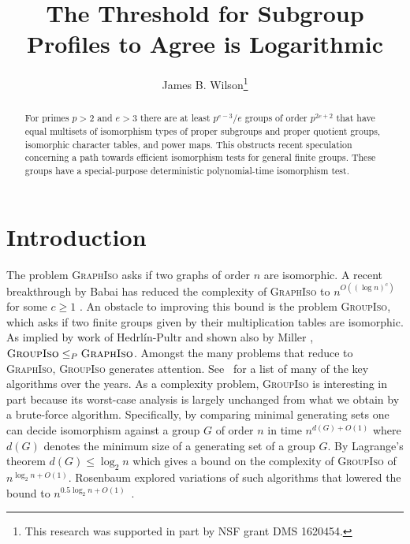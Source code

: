 \documentclass{toc}
\numberwithin{equation}{section}
\theoremstyle{plain}       %
\theoremstyle{remark}
\theoremstyle{definition}
\numberwithin{figure}{section}
\numberwithin{table}{section}
\begin{document}
\begin{frontmatter}[classification=text]
  
%
%
%
\title{The Threshold for Subgroup Profiles to Agree is Logarithmic}
%

%
%

%
%
%

%
%
%
%
%
%
%
%
%
%
%
%


%
%
%
%

%

\author[wilson]{James B. Wilson\thanks{This research was supported in part by  NSF grant DMS 1620454.}}

%
%
%
%

%
%
%
%
%
%
\begin{abstract}
  For primes $p>2$ and $e>3$ there are at least $p^{e-3}/e$ groups of order
  $p^{2e+2}$ that have equal multisets of isomorphism types of proper subgroups
  and proper quotient groups, isomorphic character tables, and power maps.
  This
  obstructs recent speculation concerning a path towards efficient isomorphism
  tests for general finite groups. These groups have a special-purpose 
  deterministic polynomial-time isomorphism test.  
\end{abstract}

%

\end{frontmatter}

%
%
%
\section{Introduction}
The problem \textsc{GraphIso} asks if two graphs of order $n$ are isomorphic.  A
recent breakthrough  by Babai has reduced the complexity of \textsc{GraphIso} to
$n^{O((\log n)^c)}$ for some $c\geq 1$ \cite{Babai:graph}.  An obstacle to
improving this bound is the problem \textsc{GroupIso}, which asks if two finite
groups  given by their multiplication tables are isomorphic.  As implied by work
of Hedrl\'in-Pultr \cite{PH} and shown also by Miller \cite{Miller},
$\textsc{GroupIso}\leq_P \textsc{GraphIso}$.  Amongst the many problems that
reduce to \textsc{GraphIso}, \textsc{GroupIso} generates attention.  See~\cite{ELGOB} for a list of many of the key algorithms over the years.  As a
complexity problem, \textsc{GroupIso} is interesting in part because its
worst-case analysis is largely unchanged from what we obtain by a brute-force
algorithm.  Specifically, by comparing minimal generating sets one can decide
isomorphism against a group $G$ of order $n$ in time $n^{d(G)+O(1)}$ where
$d(G)$ denotes the minimum size of a generating set of a group $G$.  By
Lagrange's theorem $d(G)\leq \log_2 n$ which gives a bound on the complexity of
\textsc{GroupIso} of $n^{\log_2 n+O(1)}$. Rosenbaum explored variations of such
algorithms that lowered the bound to $n^{0.5\log_2 n+O(1)}$~\cite{Rosenbaum}.
\end{document}
